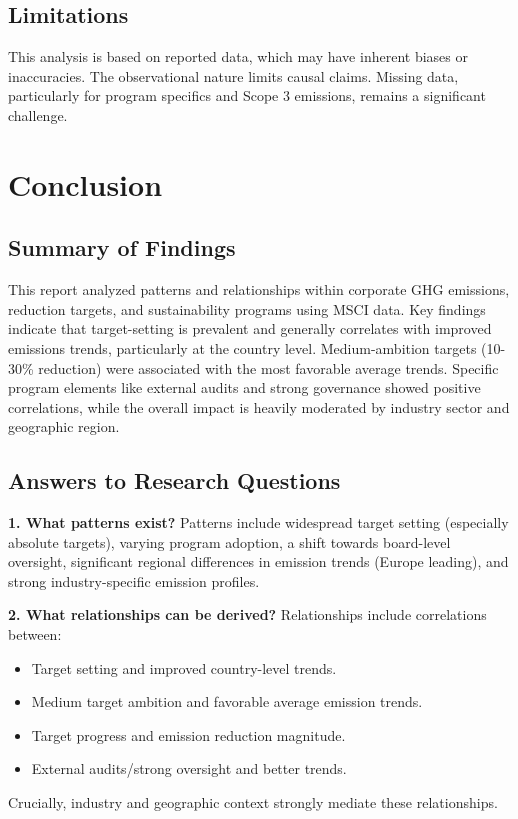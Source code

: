 \documentclass[11pt,a4paper]{article}
\begin{document}
\subsection{Limitations}
This analysis is based on reported data, which may have inherent biases or inaccuracies. The observational nature limits causal claims. Missing data, particularly for program specifics and Scope 3 emissions, remains a significant challenge.

\section{Conclusion}

\subsection{Summary of Findings}
This report analyzed patterns and relationships within corporate GHG emissions, reduction targets, and sustainability programs using MSCI data. Key findings indicate that target-setting is prevalent and generally correlates with improved emissions trends, particularly at the country level. Medium-ambition targets (10-30\% reduction) were associated with the most favorable average trends. Specific program elements like external audits and strong governance showed positive correlations, while the overall impact is heavily moderated by industry sector and geographic region.

\subsection{Answers to Research Questions}
\textbf{1. What patterns exist?} Patterns include widespread target setting (especially absolute targets), varying program adoption, a shift towards board-level oversight, significant regional differences in emission trends (Europe leading), and strong industry-specific emission profiles.

\textbf{2. What relationships can be derived?} Relationships include correlations between:
\begin{itemize}
    \item Target setting and improved country-level trends.
    \item Medium target ambition and favorable average emission trends.
    \item Target progress and emission reduction magnitude.
    \item External audits/strong oversight and better trends.
\end{itemize}
Crucially, industry and geographic context strongly mediate these relationships.
\end{document}

